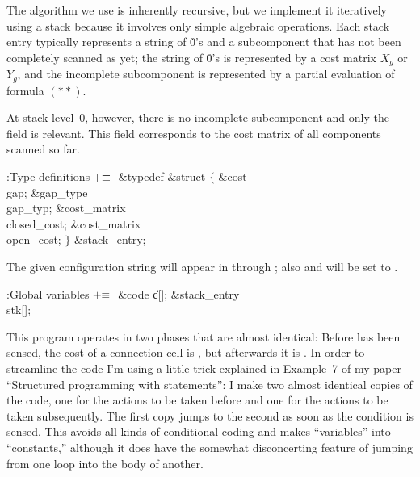 The algorithm we use is inherently recursive, but we implement it
iteratively using a stack because it involves only simple algebraic
operations. Each stack entry typically represents a string of \.0's
and a subcomponent that has not been completely scanned as yet;
the string of \.0's is represented by a cost matrix $X_g$ or $Y_g$,
and the incomplete subcomponent is represented by a partial evaluation
of formula $(**)$.

At stack level~0, however, there is no incomplete subcomponent and
only the  field is relevant. This field corresponds to
the cost matrix of all components scanned so far.

\Y\B\4:Type definitions\X${}\mathrel+\equiv{}$\6
\&{typedef} \&{struct} ${}\{{}$\1\6
\&{cost} \\{gap};\6
\&{gap\_type} \\{gap\_typ};\6
\&{cost\_matrix} \\{closed\_cost};\6
\&{cost\_matrix} \\{open\_cost};\2\6
${}\}{}$ \&{stack\_entry};\par
\fi

The given configuration string will appear in  through %
;
also  and  will be set to .

\Y\B\4:Global variables\X${}\mathrel+\equiv{}$\6
\&{code} \|c[];\6
\&{stack\_entry} \\{stk}[];\par
\fi

This program operates in two phases that are almost identical:
Before  has been sensed, the cost of a connection cell is
, but afterwards it is . In order to
streamline
the code I'm using a little trick explained in Example~7 of my paper
``Structured programming with  statements'': I make two almost
identical copies of the code, one for the actions to be taken before
 and one for the actions to be taken subsequently.
The first copy jumps to the second as soon as the condition  is
sensed. This avoids all kinds of conditional coding and makes ``variables''
into ``constants,'' although it does have the somewhat disconcerting feature
of jumping from one loop into the body of another.

